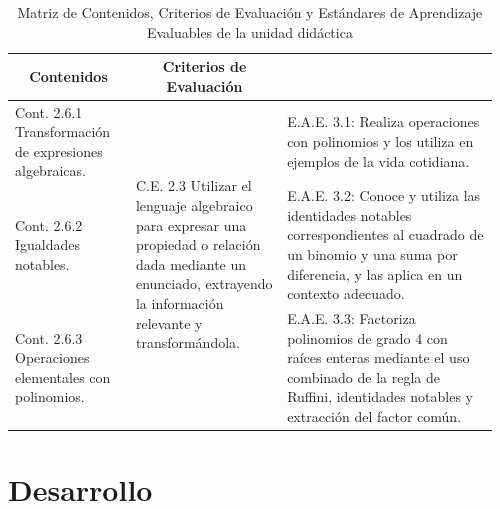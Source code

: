 \documentclass[10pt,notes,compress,usetitleprogressbar,aspectratio=1610]{beamer}
\begin{document}
\begin{frame}
	\begin{table}[hbt]
		\centering
		\caption{Matriz de Contenidos, Criterios de Evaluación y  Estándares de Aprendizaje Evaluables de la unidad didáctica}
		\label{tbl:Matrizdetodo}
		\begin{tabular}{|p{0.24\linewidth}|p{0.3\linewidth}|p{0.42\linewidth}|}
		\hline
		 \multicolumn{1}{|c|}{Contenidos} & \multicolumn{1}{|c|}{Criterios de Evaluación} & \multicolumn{1}{c|}{}
		\\\hline

		{Cont. 2.6.1} Transformación de expresiones algebraicas. 
		&
		\multirow{3}{\linewidth}{{C.E. 2.3} Utilizar el lenguaje algebraico para expresar una propiedad o relación dada mediante un enunciado, extrayendo la información relevante y transformándola.\vfill}
		& 
		{E.A.E. 3.1}: Realiza operaciones con polinomios y los utiliza en ejemplos de la vida cotidiana.
		\\\cline{1-1} \cline{3-3} 

		{Cont. 2.6.2} Igualdades notables. 
		&
		& 
		{E.A.E. 3.2}: Conoce y utiliza las identidades notables correspondientes al cuadrado de un binomio y una suma por diferencia, y las aplica en un contexto adecuado. 
		\\\cline{1-1} \cline{3-3} 

		{Cont. 2.6.3} Operaciones elementales con polinomios. 
		&
		&
		{E.A.E. 3.3}: Factoriza polinomios de grado 4 con raíces enteras mediante el uso combinado de la regla de Ruffini, identidades notables y extracción del factor común.
		\\\hline
		\end{tabular}
	\end{table}
\end{frame}


\section{Desarrollo}
\end{document}
